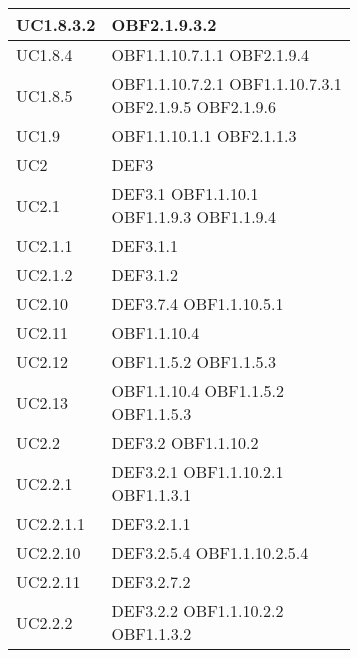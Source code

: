 \documentclass{scalatekids-article}
\begin{document}
\begin{longtable}[H]{|p{5.5cm}|p{5.5cm}|}
  \hline
  UC1.8.3.2 & \multiLineCell[t]{OBF2.1.9.3.2\\}\\
  \hline
  UC1.8.4 & \multiLineCell[t]{OBF1.1.10.7.1.1 OBF2.1.9.4\\}\\
  \hline
  UC1.8.5 & \multiLineCell[t]{OBF1.1.10.7.2.1 OBF1.1.10.7.3.1\\OBF2.1.9.5 OBF2.1.9.6\\}\\
  \hline
  UC1.9 & \multiLineCell[t]{OBF1.1.10.1.1 OBF2.1.1.3\\}\\
  \hline
  UC2 & \multiLineCell[t]{DEF3\\}\\
  \hline
  UC2.1 & \multiLineCell[t]{DEF3.1 OBF1.1.10.1\\OBF1.1.9.3 OBF1.1.9.4\\}\\
  \hline
  UC2.1.1 & \multiLineCell[t]{DEF3.1.1\\}\\
  \hline
  UC2.1.2 & \multiLineCell[t]{DEF3.1.2\\}\\
  \hline
  UC2.10 & \multiLineCell[t]{DEF3.7.4 OBF1.1.10.5.1\\}\\
  \hline
  UC2.11 & \multiLineCell[t]{OBF1.1.10.4\\}\\
  \hline
  UC2.12 & \multiLineCell[t]{OBF1.1.5.2 OBF1.1.5.3\\}\\
  \hline
  UC2.13 & \multiLineCell[t]{OBF1.1.10.4 OBF1.1.5.2\\OBF1.1.5.3}\\
  \hline
  UC2.2 & \multiLineCell[t]{DEF3.2 OBF1.1.10.2\\}\\
  \hline
  UC2.2.1 & \multiLineCell[t]{DEF3.2.1 OBF1.1.10.2.1\\OBF1.1.3.1}\\
  \hline
  UC2.2.1.1 & \multiLineCell[t]{DEF3.2.1.1\\}\\
  \hline
  UC2.2.10 & \multiLineCell[t]{DEF3.2.5.4 OBF1.1.10.2.5.4\\}\\
  \hline
  UC2.2.11 & \multiLineCell[t]{DEF3.2.7.2\\}\\
  \hline
  UC2.2.2 & \multiLineCell[t]{DEF3.2.2 OBF1.1.10.2.2\\OBF1.1.3.2\\}\\

\end{longtable}
\end{document}
